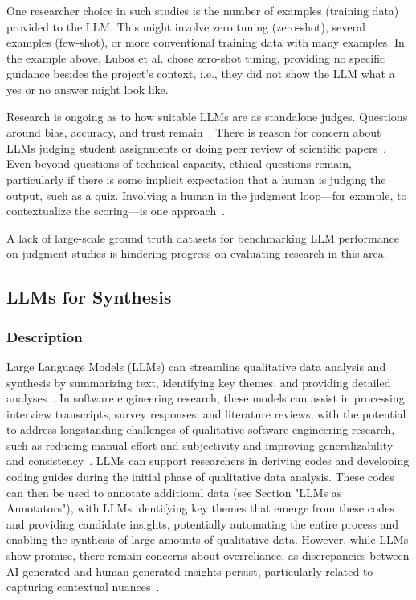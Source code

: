 One researcher choice in such studies is the number of examples (training data) provided to the LLM. This might involve zero tuning (zero-shot), several examples (few-shot), or more conventional training data with many examples. In the example above, Lubos et al. chose zero-shot tuning, providing no specific guidance besides the project's context, i.e., they did not show the LLM what a yes or no answer might look like. 

Research is ongoing as to how suitable LLMs are as standalone judges. Questions around bias, accuracy, and trust remain~\cite{DBLP:journals/corr/abs-2406-18403}. There is reason for concern about LLMs judging student assignments or doing peer review of scientific papers~\cite{DBLP:conf/coling/ZhouC024}. Even beyond questions of technical capacity, ethical questions remain, particularly if there is some implicit expectation that a human is judging the output, such as a quiz. Involving a human in the judgment loop---for example, to contextualize the scoring---is one approach~\cite{panHumanCenteredDesignRecommendations2024}. 

A lack of large-scale ground truth datasets for benchmarking LLM performance on judgment studies is hindering progress on evaluating research in this area.

\subsection{LLMs for Synthesis}

\subsubsection{Description}

Large Language Models (LLMs) can streamline qualitative data analysis and synthesis by summarizing text, identifying key themes, and providing detailed analyses~\cite{DBLP:conf/chi/ByunVS23}. In software engineering research, these models can assist in processing interview transcripts, survey responses, and literature reviews, with the potential to address longstanding challenges of qualitative software engineering research, such as reducing manual effort and subjectivity and improving generalizability and consistency~\cite{DBLP:journals/ase/BanoHZT24}. LLMs can support researchers in deriving codes and developing coding guides during the initial phase of qualitative data analysis. These codes can then be used to annotate additional data (see Section "LLMs as Annotators"), with LLMs identifying key themes that emerge from these codes and providing candidate insights, potentially automating the entire process and enabling the synthesis of large amounts of qualitative data. However, while LLMs show promise, there remain concerns about overreliance, as discrepancies between AI-generated and human-generated insights persist, particularly related to capturing contextual nuances~\cite{bano2023exploringqualitativeresearchusing}.

